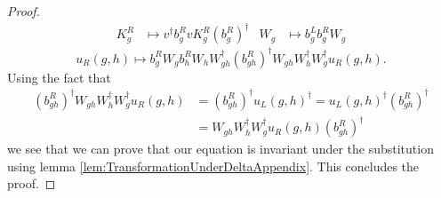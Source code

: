 \documentclass[12pt,a4paper,twoside]{article}
\numberwithin{equation}{section}
\begin{document}
\begin{proof}
	\begin{align}
		K_g^R&\mapsto v^\dagger b_g^R v K_g^R (b_g^R)^\dagger&W_g&\mapsto b_g^Lb_g^RW_g
	\end{align}
	\begin{equation}
		u_R(g,h)\mapsto b_g^R W_g b_h^R W_h W_{gh}^\dagger (b_{gh}^R)^\dagger W_{gh}W_h^\dagger W_g^\dagger u_R(g,h).
	\end{equation}
	Using the fact that
	\begin{align}
		(b_{gh}^R)^\dagger W_{gh}W_h^\dagger W_g^\dagger u_R(g,h)&=(b_{gh}^R)^\dagger u_L(g,h)^\dagger=u_L(g,h)^\dagger(b_{gh}^R)^\dagger\\
		&=W_{gh}W_h^\dagger W_g^\dagger u_R(g,h) (b_{gh}^R)^\dagger
	\end{align}
	we see that we can prove that our equation is invariant under the substitution using lemma \ref{lem:TransformationUnderDeltaAppendix}. This concludes the proof.
\end{proof}
\end{document}
